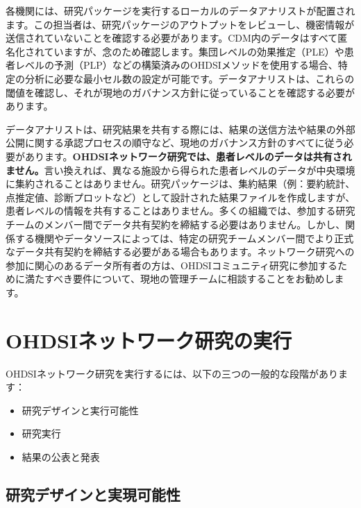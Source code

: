 \documentclass[
  11pt]{book}
\providecommand{\tightlist}{%
  \setlength{\itemsep}{0pt}\setlength{\parskip}{0pt}}
\theoremstyle{definition}
\theoremstyle{definition}
\theoremstyle{definition}
\theoremstyle{definition}
\theoremstyle{remark}
\begin{document}
各機関には、研究パッケージを実行するローカルのデータアナリストが配置されます。この担当者は、研究パッケージのアウトプットをレビューし、機密情報が送信されていないことを確認する必要があります。CDM内のデータはすべて匿名化されていますが、念のため確認します。集団レベルの効果推定（PLE）や患者レベルの予測（PLP）などの構築済みのOHDSIメソッドを使用する場合、特定の分析に必要な最小セル数の設定が可能です。データアナリストは、これらの閾値を確認し、それが現地のガバナンス方針に従っていることを確認する必要があります。

データアナリストは、研究結果を共有する際には、結果の送信方法や結果の外部公開に関する承認プロセスの順守など、現地のガバナンス方針のすべてに従う必要があります。\textbf{OHDSIネットワーク研究では、患者レベルのデータは共有されません。}言い換えれば、異なる施設から得られた患者レベルのデータが中央環境に集約されることはありません。研究パッケージは、集約結果（例：要約統計、点推定値、診断プロットなど）として設計された結果ファイルを作成しますが、患者レベルの情報を共有することはありません。多くの組織では、参加する研究チームのメンバー間でデータ共有契約を締結する必要はありません。しかし、関係する機関やデータソースによっては、特定の研究チームメンバー間でより正式なデータ共有契約を締結する必要がある場合もあります。ネットワーク研究への参加に関心のあるデータ所有者の方は、OHDSIコミュニティ研究に参加するために満たすべき要件について、現地の管理チームに相談することをお勧めします。

\section{OHDSIネットワーク研究の実行}\label{ohdsiux30cdux30c3ux30c8ux30efux30fcux30afux7814ux7a76ux306eux5b9fux884c}


OHDSIネットワーク研究を実行するには、以下の三つの一般的な段階があります：

\begin{itemize}
\tightlist
\item
  研究デザインと実行可能性
\item
  研究実行
\item
  結果の公表と発表
\end{itemize}

\subsection{研究デザインと実現可能性}\label{ux7814ux7a76ux30c7ux30b6ux30a4ux30f3ux3068ux5b9fux73feux53efux80fdux6027}
\end{document}

